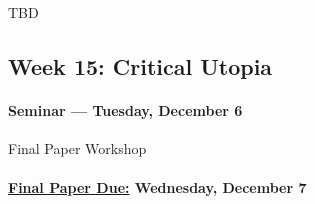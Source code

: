     \begin{itemize*}
    \item TBD
    \end{itemize*}
    
\subsection{\textbf{Week 15}: Critical Utopia}
    
    \paragraph{Seminar --- Tuesday, December 6}
\begin{itemize*}
  \item Final Paper Workshop
\end{itemize*}

\paragraph{\underline{Final Paper Due:} Wednesday, December 7}   
   